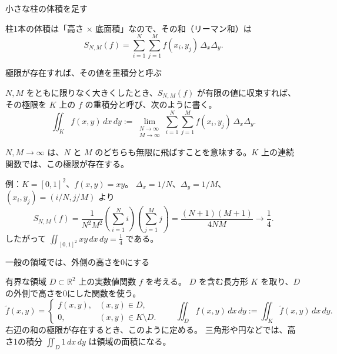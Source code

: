 \documentclass[a4paper,10pt,pdflatex,ja=standard,jafont=ipaex-type1,
  magstyle=real,scale=1]{bxjsarticle}
\newcommand{\topic}[1]{\par\vspace{5pt}%
  {\large\sffamily\mdseries\color{accent}#1}\par\vspace{2pt}}
\newcommand{\keybox}[1]{\par\vspace{3pt}\begingroup
  \setlength{\fboxsep}{4pt}%
  \colorbox{soft}{\parbox{\dimexpr\linewidth-2\fboxsep\relax}{\small #1}}%
  \endgroup\par\vspace{2pt}}
\newcommand{\examplelabel}[1]{{\sffamily\mdseries\color{ink}#1}}
\begin{document}
\topic{小さな柱の体積を足す}
柱1本の体積は「高さ $\times$ 底面積」なので、その和（リーマン和）は
$$
 S_{N,M}(f)=\sum_{i=1}^N\sum_{j=1}^M f(x_i,y_j)\,\Delta_x\Delta_y.
$$

\newpage
\noindent\begin{minipage}[b][\dimexpr0.5\textheight-\parskip\relax][t]{\linewidth}
\topic{極限が存在すれば、その値を重積分と呼ぶ}
\keybox{$N,M$ をともに限りなく大きくしたとき、$S_{N,M}(f)$ が有限の値に収束すれば、
その極限を $K$ 上の $f$ の重積分と呼び、次のように書く。
$$
 \iint_K f(x,y)\,dx\,dy
 :=\lim_{\substack{N\to\infty\\M\to\infty}}
 \sum_{i=1}^N\sum_{j=1}^M f(x_i,y_j)\,\Delta_x\Delta_y.
$$
}
$N,M\to\infty$ は、$N$ と $M$ のどちらも無限に飛ばすことを意味する。$K$ 上の連続関数では、この極限が存在する。

\examplelabel{例：$K=[0,1]^2$、$f(x,y)=xy$。}
$\Delta_x=1/N$、$\Delta_y=1/M$、$(x_i,y_j)=(i/N,j/M)$ より
$$
 S_{N,M}(f)=\frac1{N^2M^2}
 \left(\sum_{i=1}^N i\right)\left(\sum_{j=1}^M j\right)
 =\frac{(N+1)(M+1)}{4NM}\longrightarrow\frac14.
$$
したがって $\displaystyle\iint_{[0,1]^2}xy\,dx\,dy=\frac14$ である。

\topic{一般の領域では、外側の高さを0にする}
有界な領域 $D\subset\mathbb R^2$ 上の実数値関数 $f$ を考える。
$D$ を含む長方形 $K$ を取り、$D$ の外側で高さを0にした関数を使う。
$$
 \widetilde f(x,y)=\begin{cases}
  f(x,y),&(x,y)\in D,\\
  0,&(x,y)\in K\setminus D.
 \end{cases}
 \qquad
 \iint_D f(x,y)\,dx\,dy:=\iint_K\widetilde f(x,y)\,dx\,dy.
$$
右辺の和の極限が存在するとき、このように定める。
三角形や円などでは、高さ1の積分 $\displaystyle\iint_D1\,dx\,dy$ は領域の面積になる。

\end{minipage}\par\nointerlineskip
\end{document}
